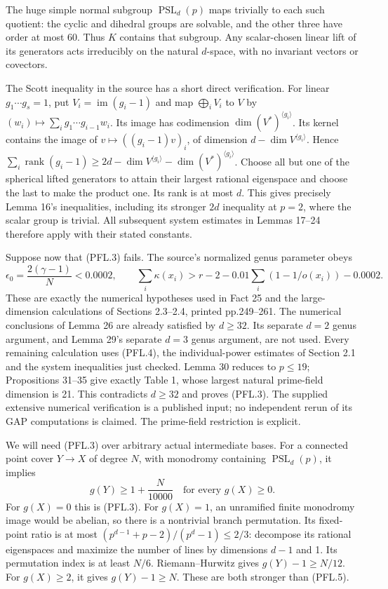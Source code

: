 The huge simple normal subgroup \(\operatorname{PSL}_d(p)\) maps
trivially to each such quotient: the cyclic and dihedral groups
are solvable, and the other three have order at most 60. Thus
\(K\) contains that subgroup. Any scalar-chosen linear lift of its
generators acts irreducibly on the natural \(d\)-space, with no
invariant vectors or covectors.

The Scott inequality in the source has a short direct verification.
For linear \(g_1\cdots g_s=1\), put \(V_i=\operatorname{im}(g_i-1)\)
and map \(\bigoplus_iV_i\) to \(V\) by
\((w_i)\mapsto\sum_i g_1\cdots g_{i-1}w_i\).
Its image has codimension \(\dim(V^*)^{\langle g_i\rangle}\).
Its kernel contains the image of
\(v\mapsto((g_i-1)v)_i\), of dimension
\(d-\dim V^{\langle g_i\rangle}\). Hence
\(\sum_i\operatorname{rank}(g_i-1)\ge
2d-\dim V^{\langle g_i\rangle}-\dim(V^*)^{\langle g_i\rangle}\).
Choose all but one of the spherical lifted generators to attain
their largest rational eigenspace and choose the last to make the
product one. Its rank is at most \(d\). This gives precisely
Lemma 16's inequalities, including its stronger \(2d\) inequality
at \(p=2\), where the scalar group is trivial. All subsequent
system estimates in Lemmas 17--24 therefore apply with their
stated constants.

Suppose now that (PFL.3) fails. The source's normalized genus
parameter obeys
\[
 \epsilon_0=\frac{2(\gamma-1)}{N}<0.0002,\qquad
 \sum_i\kappa(x_i)>
 r-2-0.01\sum_i(1-1/o(x_i))-0.0002.
 \tag{PFL.4}
\]
These are exactly the numerical hypotheses used in Fact 25 and
the large-dimension calculations of Sections 2.3--2.4,
printed pp.249--261. The numerical conclusions of Lemma 26
are already satisfied by \(d\ge32\). Its separate \(d=2\)
genus argument, and Lemma 29's separate \(d=3\) genus argument,
are not used. Every remaining calculation uses (PFL.4), the
individual-power estimates of Section 2.1 and the system
inequalities just checked. Lemma 30 reduces to \(p\le19\);
Propositions 31--35 give exactly Table 1, whose largest natural
prime-field dimension is 21. This contradicts \(d\ge32\) and
proves (PFL.3). The supplied extensive numerical verification is
a published input; no independent rerun of its GAP computations
is claimed. The prime-field restriction is explicit.

We will need (PFL.3) over arbitrary actual intermediate bases.
For a connected point cover \(Y\to X\) of degree \(N\), with
monodromy containing \(\operatorname{PSL}_d(p)\), it implies
\[
                            g(Y)\ge1+\frac{N}{10000}
                            \quad\text{for every }g(X)\ge0.
 \tag{PFL.5}
\]
For \(g(X)=0\) this is (PFL.3). For \(g(X)=1\), an unramified
finite monodromy image would be abelian, so there is a nontrivial
branch permutation. Its fixed-point ratio is at most
\((p^{d-1}+p-2)/(p^d-1)\le2/3\): decompose its rational
eigenspaces and maximize the number of lines by dimensions
\(d-1\) and 1. Its permutation index is at least \(N/6\).
Riemann--Hurwitz gives \(g(Y)-1\ge N/12\).
For \(g(X)\ge2\), it gives \(g(Y)-1\ge N\).
These are both stronger than (PFL.5).

